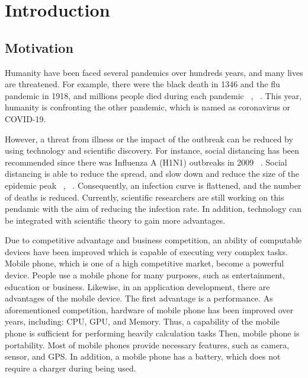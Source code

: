 \chapter{Introduction}\label{intro}
    \section{Motivation}

            Humanity have been faced several pandemics over hundreds years, and many lives are threatened.
            For example, there were the black death in 1346 and the flu pandemic in 1918, and millions people died during each pandemic ~\cite{REF1-02}, ~\cite{REF1-01}.
            This year, humanity is confronting the other pandemic, which is named as coronavirus or COVID-19.

            However, a threat from illness or the impact of the outbreak can be reduced by using technology and scientific discovery.
            For instance, social distancing has been recommended since there was Influenza A (H1N1) outbreaks in 2009 ~\cite{REF1-05}.
            Social distancing is able to reduce the spread, and slow down and reduce the size of the epidemic peak ~\cite{REF1-03}, ~\cite{REF1-04}.
            Consequently, an infection curve is flattened, and the number of deaths is reduced.
            Currently, scientific researchers are still working on this pendamic with the aim of reducing the infection rate.
            In addition, technology can be integrated with scientific theory to gain more advantages.

            Due to competitive advantage and business competition, an ability of computable devices have been improved which is capable of executing very complex tasks.
            Mobile phone, which is one of a high competitive market, become a powerful device.
            People use a mobile phone for many purposes, such as entertainment, education or business.
            Likewise, in an application development, there are advantages of the mobile device.
            The first advantage is a performance.
                As aforementioned competition, hardware of mobile phone has been improved over years, including: CPU, GPU, and Memory.
                Thus, a capability of the mobile phone is sufficient for performing heavily calculation tasks
            Then, mobile phone is portability.
                Most of mobile phones provide necessary features, such as camera, sensor, and GPS.
                In addition, a mobile phone has a battery, which does not require a charger during being used.

